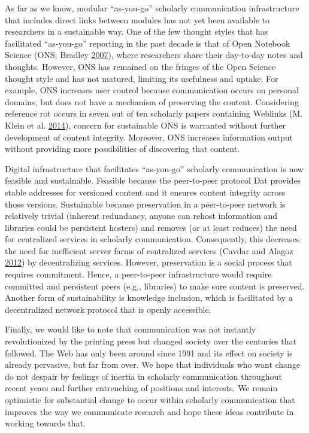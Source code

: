 \documentclass[a5paper]{book}
\begin{document}
As far as we know, modular \enquote{as-you-go} scholarly communication
infrastructure that includes direct links between modules has not yet
been available to researchers in a sustainable way. One of the few
thought styles that has facilitated \enquote{as-you-go} reporting in the
past decade is that of Open Notebook Science (ONS; Bradley
\protect\hyperlink{ref-doi:10.1038ux2fnpre.2007.39.1}{2007}), where
researchers share their day-to-day notes and thoughts. However, ONS has
remained on the fringes of the Open Science thought style and has not
matured, limiting its usefulness and uptake. For example, ONS increases
user control because communication occurs on personal domains, but does
not have a mechanism of preserving the content. Considering reference
rot occurs in seven out of ten scholarly papers containing Weblinks (M.
Klein et al.
\protect\hyperlink{ref-doi:10.1371ux2fjournal.pone.0115253}{2014}),
concern for sustainable ONS is warranted without further development of
content integrity. Moreover, ONS increases information output without
providing more possibilities of discovering that content.

Digital infrastructure that facilitates \enquote{as-you-go} scholarly
communication is now feasible and sustainable. Feasible because the
peer-to-peer protocol Dat provides stable addresses for versioned
content and it ensures content integrity across those versions.
Sustainable because preservation in a peer-to-peer network is relatively
trivial (inherent redundancy, anyone can rehost information and
libraries could be persistent hosters) and removes (or at least reduces)
the need for centralized services in scholarly communication.
Consequently, this decreases the need for inefficient server farms of
centralized services (Cavdar and Alagoz
\protect\hyperlink{ref-doi:10.1109ux2fglocom.2012.6503613}{2012}) by
decentralizing services. However, preservation is a social process that
requires commitment. Hence, a peer-to-peer infrastructure would require
committed and persistent peers (e.g., libraries) to make sure content is
preserved. Another form of sustainability is knowledge inclusion, which
is facilitated by a decentralized network protocol that is openly
accessible.

Finally, we would like to note that communication was not instantly
revolutionized by the printing press but changed society over the
centuries that followed. The Web has only been around since 1991 and its
effect on society is already pervasive, but far from over. We hope that
individuals who want change do not despair by feelings of inertia in
scholarly communication throughout recent years and further entrenching
of positions and interests. We remain optimistic for substantial change
to occur within scholarly communication that improves the way we
communicate research and hope these ideas contribute in working towards
that.
\end{document}
